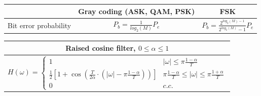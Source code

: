 \documentclass[en]{article}
\begin{document}
\begin{center}
        \renewcommand{\arraystretch}{1.5}
        \begin{tabular}{|c|c|c|}
            \hline
            & Gray coding (ASK, QAM, PSK) & FSK \\ 
            \hline
            Bit error probability & $P_b = \displaystyle\frac{1}{log_2(M)} P_e$ & $P_b = \displaystyle\frac{2^{log_2(M)-1}}{2^{log_2(M)}-1} P_e$ \\
            \hline
        \end{tabular}
        \renewcommand{\arraystretch}{1} 
        \vspace{0.5cm}
    
    \renewcommand{\arraystretch}{1.5}
    \begin{tabular}{|c|}
        \multicolumn{1}{c}{{\bf Raised cosine filter, $0 \leq \alpha \leq 1$}}\\
        \hline
        $H(\omega) = \left \{ \begin{array}{lc} 1 & |\omega| \leq \pi \displaystyle\frac{1-\alpha}{T} \\ \displaystyle\frac{1}{2} \left [ 1 + \cos \left ( \frac{T}{2\alpha} \cdot \left ( |\omega| - \pi \frac{1-\alpha}{T} \right ) \right ) \right ] & \pi \frac{1-\alpha}{T} \leq |\omega| \leq \pi \displaystyle\frac{1+\alpha}{T}\\ 0 & c.c. \end{array} \right. $ \\ 
        \hline
    \end{tabular}
    \renewcommand{\arraystretch}{1}
    \vspace{0.5cm}
  
    

\end{center}
\end{document}
